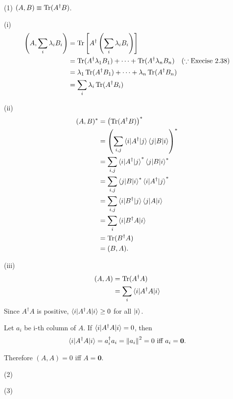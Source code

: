 
(1) $(A, B) \equiv \operatorname{Tr} (A^\dagger B)$.

\vspace{5mm}
(i)
\begin{align*}
	\left(A, \sum_i \lambda_i B_i \right) &= \operatorname{Tr} \left[ A^\dagger \left(\sum_i \lambda_i B_i  \right) \right]\\
		&= \operatorname{Tr} (A^\dagger \lambda_1 B_1) + \cdots +  \operatorname{Tr} (A^\dagger \lambda_n B_n) ~~~ (\because \text{Execise 2.38}) \\
		&= \lambda_1 \operatorname{Tr} (A^\dagger B_1)  + \cdots  + \lambda_n \operatorname{Tr} (A^\dagger B_n) \\
		&= \sum_i \lambda_i \operatorname{Tr} (A^\dagger B_i)
\end{align*}


(ii)
\begin{align*}
	(A, B)^* &= \left( \operatorname{Tr} (A^\dagger B) \right)^*\\
		&= \left(\sum_{i,j} \braket{ i | A^\dagger | j} \braket{j | B | i}  \right)^*\\
		&= \sum_{i,j} \braket{ i | A^\dagger | j}^* \braket{j | B | i}^*\\
		&= \sum_{i,j}  \braket{j | B | i}^* \braket{ i | A^\dagger | j}^*\\
		&=  \sum_{i,j}  \braket{i | B^\dagger | j} \braket{ j | A | i}\\
		&= \sum_i \braket{i | B^\dagger A | i} \\
		&= \operatorname{Tr} (B^\dagger A)\\
		&= (B, A).
\end{align*}


(iii)
\begin{align*}
	(A, A) &= \operatorname{Tr} (A^\dagger A)\\
		&= \sum_i \braket{ i | A^\dagger A | i }
\end{align*}
Since $A^\dagger A$ is positive, $\braket{ i | A^\dagger A | i } \geq 0$ for all $\ket{ i }$.


Let $a_i$ be i-th column of $A$.
If $\braket{ i | A^\dagger A | i } = 0$, then
\begin{align*}
	\braket{ i | A^\dagger A | i } = a^\dagger_i a_i = \left\lVert a_i\right\rVert^2 = 0 \text{ iff }a_i = \mathbf{0}.
\end{align*}

Therefore $(A, A) = 0$ iff $A = \mathbf{0}$.

\vspace{5mm}
(2)

(3)


%
%

